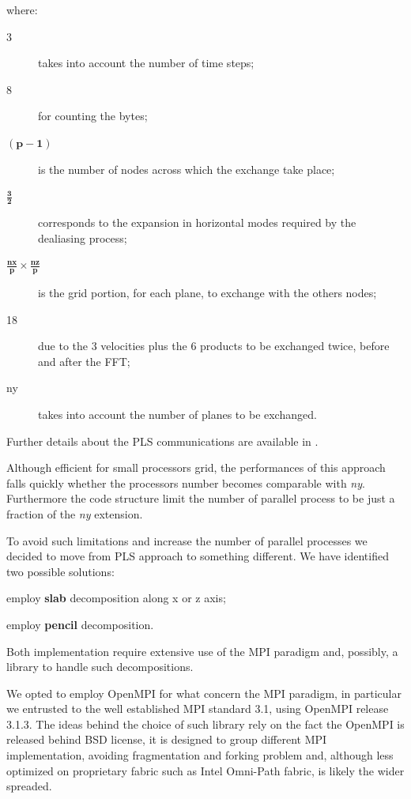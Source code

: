  where:
 \begin{description}
  \item[3] takes into account the number of time steps;
  \item[8] for counting the bytes;
  \item[$\mathbf{(p-1)}$] is the number of nodes across which the exchange take place;
  \item[ $\mathbf{\frac{3}{2}}$ ] corresponds to the expansion in horizontal modes required by the dealiasing process;
  \item[ $\mathbf{\frac{nx}{p} \times \frac{nz}{p}}$] is the grid portion, for each plane, to exchange with the others nodes;
  \item[18] due to the 3 velocities plus the 6 products to be exchanged twice, before and after the FFT;
  \item[ny] takes into account the number of planes to be exchanged.
\end{description}
Further details about the PLS communications are available in \cite[\nopp chapter 4.2]{ns:quadrio}. \\
 \par
Although efficient for small processors grid, the performances of this approach falls quickly whether the processors number becomes comparable with \emph{ny}.  Furthermore the code structure limit the number of parallel process to be just a fraction of the \emph{ny} extension. \\
\par
To avoid such limitations and increase the number of parallel processes we decided to move from PLS approach to something different.
We have identified two possible solutions:
\begin{description}
  \item employ \textbf{slab} decomposition along x or z axis;
  \item employ \textbf{pencil} decomposition.
\end{description}
Both implementation require extensive use of the MPI paradigm and, possibly, a library to handle such decompositions.
\par
We opted to employ OpenMPI\cite{openmpi} for what concern the MPI paradigm, in particular we entrusted to the well established MPI standard 3.1\cite{MPI:standard}, using OpenMPI release 3.1.3.
The ideas behind the choice of such library rely on the fact the OpenMPI is released behind BSD license\cite{bsd:license}, it is designed to group different MPI implementation, avoiding fragmentation and forking problem\cite{faq:openmpi} and, although less optimized on proprietary fabric such as Intel Omni-Path fabric\cite{intel:omnipath}\cite{intel:intelmpivsopenmpi}, is likely the wider spreaded.
